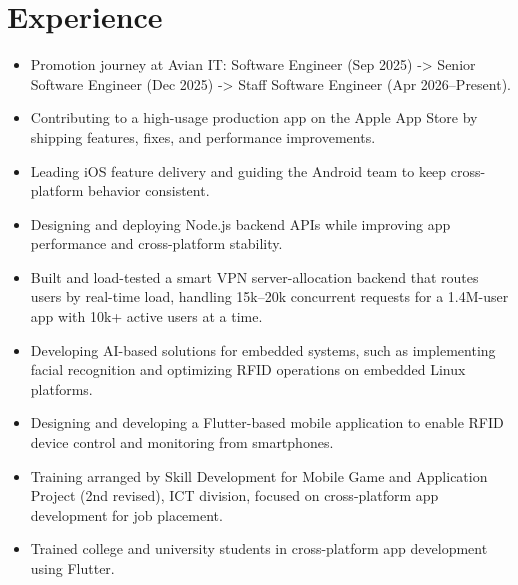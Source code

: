 \documentclass[]{plushcv}
\begin{document}
\begin{minipage}[t]{0.6\textwidth}

\section{Experience}
\begin{itemize}[leftmargin=*,noitemsep,topsep=2pt]
\item Promotion journey at Avian IT: Software Engineer (Sep 2025) -> Senior Software Engineer (Dec 2025) -> Staff Software Engineer (Apr 2026--Present).
\item Contributing to a high-usage production app on the Apple App Store by shipping features, fixes, and performance improvements.
\item Leading iOS feature delivery and guiding the Android team to keep cross-platform behavior consistent.
\item Designing and deploying Node.js backend APIs while improving app performance and cross-platform stability.
\item Built and load-tested a smart VPN server-allocation backend that routes users by real-time load, handling 15k--20k concurrent requests for a 1.4M-user app with 10k+ active users at a time.

\end{itemize}

\begin{itemize}[leftmargin=*,noitemsep,topsep=2pt]
\item Developing AI-based solutions for embedded systems, such as implementing facial recognition and optimizing RFID operations on embedded Linux platforms.
\item Designing and developing a Flutter-based mobile application to enable RFID device control and monitoring from smartphones.
\end{itemize}

\begin{itemize}[leftmargin=*,noitemsep,topsep=2pt]
\item Training arranged by Skill Development for Mobile Game and Application Project (2nd revised), ICT division, focused on cross-platform app development for job placement.
\item Trained college and university students in cross-platform app development using Flutter.
\end{itemize}


\end{minipage}
\end{document}
